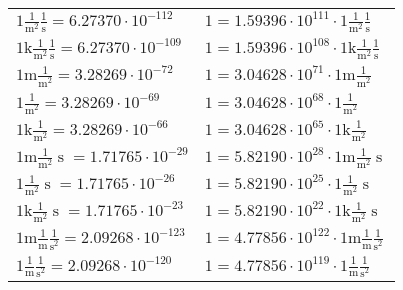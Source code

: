 \begin{center}
\begin{longtable}{l l}
{\color{black}$1 \bm{\mathrm{ }}\frac1{\operatorname{m}^2}\frac1{\operatorname{s}}{}{} = 6.27370\cdot10^{-112} $}   & {\color{black}$ 1 = 1.59396\cdot10^{111} \cdot 1 \bm{\mathrm{ }}\frac1{\operatorname{m}^2}\frac1{\operatorname{s}}{}{}$}  \\
{\color{gray}$1 \bm{\mathrm{ k}}\frac1{\operatorname{m}^2}\frac1{\operatorname{s}}{}{} = 6.27370\cdot10^{-109} $}   & {\color{gray}$ 1 = 1.59396\cdot10^{108} \cdot 1 \bm{\mathrm{ k}}\frac1{\operatorname{m}^2}\frac1{\operatorname{s}}{}{}$}  \\
{\color{gray}$1 \bm{\mathrm{ m}}\frac1{\operatorname{m}^2}{}{}{} = 3.28269\cdot10^{-72} $}   & {\color{gray}$ 1 = 3.04628\cdot10^{71} \cdot 1 \bm{\mathrm{ m}}\frac1{\operatorname{m}^2}{}{}{}$}  \\
{\color{black}$1 \bm{\mathrm{ }}\frac1{\operatorname{m}^2}{}{}{} = 3.28269\cdot10^{-69} $}   & {\color{black}$ 1 = 3.04628\cdot10^{68} \cdot 1 \bm{\mathrm{ }}\frac1{\operatorname{m}^2}{}{}{}$}  \\
{\color{gray}$1 \bm{\mathrm{ k}}\frac1{\operatorname{m}^2}{}{}{} = 3.28269\cdot10^{-66} $}   & {\color{gray}$ 1 = 3.04628\cdot10^{65} \cdot 1 \bm{\mathrm{ k}}\frac1{\operatorname{m}^2}{}{}{}$}  \\
{\color{gray}$1 \bm{\mathrm{ m}}\frac1{\operatorname{m}^2}{\operatorname{s}}{}{} = 1.71765\cdot10^{-29} $}   & {\color{gray}$ 1 = 5.82190\cdot10^{28} \cdot 1 \bm{\mathrm{ m}}\frac1{\operatorname{m}^2}{\operatorname{s}}{}{}$}  \\
{\color{black}$1 \bm{\mathrm{ }}\frac1{\operatorname{m}^2}{\operatorname{s}}{}{} = 1.71765\cdot10^{-26} $}   & {\color{black}$ 1 = 5.82190\cdot10^{25} \cdot 1 \bm{\mathrm{ }}\frac1{\operatorname{m}^2}{\operatorname{s}}{}{}$}  \\
{\color{gray}$1 \bm{\mathrm{ k}}\frac1{\operatorname{m}^2}{\operatorname{s}}{}{} = 1.71765\cdot10^{-23} $}   & {\color{gray}$ 1 = 5.82190\cdot10^{22} \cdot 1 \bm{\mathrm{ k}}\frac1{\operatorname{m}^2}{\operatorname{s}}{}{}$}  \\
{\color{gray}$1 \bm{\mathrm{ m}}\frac1{\operatorname{m}}\frac1{\operatorname{s}^2}{}{} = 2.09268\cdot10^{-123} $}   & {\color{gray}$ 1 = 4.77856\cdot10^{122} \cdot 1 \bm{\mathrm{ m}}\frac1{\operatorname{m}}\frac1{\operatorname{s}^2}{}{}$}  \\
{\color{black}$1 \bm{\mathrm{ }}\frac1{\operatorname{m}}\frac1{\operatorname{s}^2}{}{} = 2.09268\cdot10^{-120} $}   & {\color{black}$ 1 = 4.77856\cdot10^{119} \cdot 1 \bm{\mathrm{ }}\frac1{\operatorname{m}}\frac1{\operatorname{s}^2}{}{}$}  \\

\end{longtable}
\end{center}
